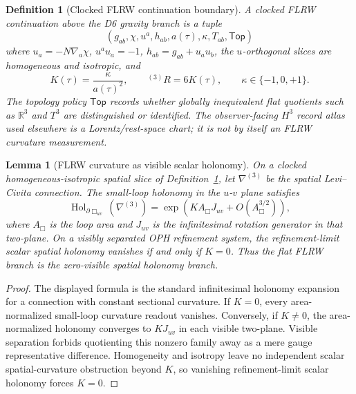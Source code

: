 \documentclass[11pt]{article}
\newtheorem{lemma}[theorem]{Lemma}
\newtheorem{definition}[theorem]{Definition}
\begin{document}
\begin{definition}[Clocked FLRW continuation boundary]\label{def:clocked-flrw-boundary}
A clocked FLRW continuation above the D6 gravity branch is a tuple
\[
(g_{ab},\chi,u^a,h_{ab},a(\tau),\kappa,T_{ab},\mathsf{Top})
\]
where \(u_a=-N\nabla_a\chi\), \(u^au_a=-1\), \(h_{ab}=g_{ab}+u_au_b\), the \(u\)-orthogonal
slices are homogeneous and isotropic, and
\[
K(\tau)=\frac{\kappa}{a(\tau)^2},\qquad {}^{(3)}R=6K(\tau),\qquad \kappa\in\{-1,0,+1\}.
\]
The topology policy \(\mathsf{Top}\) records whether globally inequivalent flat quotients such as
\(\mathbb R^3\) and \(T^3\) are distinguished or identified. The observer-facing \(H^3\) record
atlas used elsewhere is a Lorentz/rest-space chart; it is not by itself an FLRW curvature
measurement.
\end{definition}

\begin{lemma}[FLRW curvature as visible scalar holonomy]\label{lem:flrw-curvature-holonomy}
On a clocked homogeneous-isotropic spatial slice of Definition~\ref{def:clocked-flrw-boundary},
let \(\nabla^{(3)}\) be the spatial Levi--Civita connection. The small-loop holonomy in the
\(u\)-\(v\) plane satisfies
\[
\operatorname{Hol}_{\partial\Box_{uv}}(\nabla^{(3)})
=
\exp\!\left(KA_\Box J_{uv}+O(A_\Box^{3/2})\right),
\]
where \(A_\Box\) is the loop area and \(J_{uv}\) is the infinitesimal rotation generator in that
two-plane. On a visibly separated OPH refinement system, the refinement-limit scalar spatial
holonomy vanishes if and only if \(K=0\). Thus the flat FLRW branch is the zero-visible spatial
holonomy branch.
\end{lemma}

\begin{proof}
The displayed formula is the standard infinitesimal holonomy expansion for a connection with
constant sectional curvature. If \(K=0\), every area-normalized small-loop curvature readout
vanishes. Conversely, if \(K\ne0\), the area-normalized holonomy converges to \(KJ_{uv}\) in each
visible two-plane. Visible separation forbids quotienting this nonzero family away as a mere gauge
representative difference. Homogeneity and isotropy leave no independent scalar spatial-curvature
obstruction beyond \(K\), so vanishing refinement-limit scalar holonomy forces \(K=0\).
\end{proof}
\end{document}
